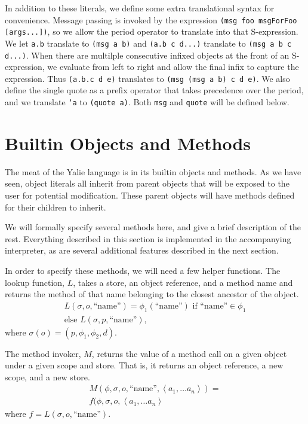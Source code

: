 \documentclass[twocolumn]{article}
\begin{document}
In addition to these literals, we define some extra translational
syntax for convenience. Message passing is invoked by the expression
\texttt{(msg foo msgForFoo [args...])}, so we allow the period
operator to translate into that S-expression. We let \texttt{a.b}
translate to \texttt{(msg a b)} and \texttt{(a.b c d...)} translate to
\texttt{(msg a b c d...)}. When there are multilple consecutive
infixed objects at the front of an S-expression, we evaluate from left
to right and allow the final infix to capture the expression. Thus
\texttt{(a.b.c d e)} translates to \texttt{(msg (msg a b) c d e)}. We
also define the single quote as a prefix operator that takes
precedence over the period, and we translate \texttt{`a} to
\texttt{(quote a)}. Both \texttt{msg} and \texttt{quote} will be
defined below.

\section*{Builtin Objects and Methods}
The meat of the Yalie language is in its builtin objects and
methods. As we have seen, object literals all inherit from parent
objects that will be exposed to the user for potential
modification. These parent objects will have methods defined for their
children to inherit.

We will formally specify several methods here, and give a brief
description of the rest. Everything described in this section is
implemented in the accompanying interpreter, as are several additional
features described in the next section.

In order to specify these methods, we will need a few helper
functions. The lookup function, $L$, takes a store, an object
reference, and a method name and returns the method of that name
belonging to the closest ancestor of the object.
\begin{multline*}
  L(\sigma,o,\text{``name''}) = \phi_1(\text{``name''}) \text{ if
  ``name''} \in \phi_1 \\\text{else }L(\sigma,p,\text{``name''}),
\end{multline*}
where $\sigma(o)=(p,\phi_1,\phi_2,d)$.

The method invoker, $M$, returns the value of a method call on a given
object under a given scope and store. That is, it returns an object
reference, a new scope, and a new store.
\begin{multline*} M(\phi,\sigma,o,\text{``name''},\left<a_1,\ldots a_n\right>)
 =\\ f( \phi, \sigma, o, \left<a_1, \ldots a_n\right>
\end{multline*}
where $f = L(\sigma,o,\text{``name''})$.
\end{document}
